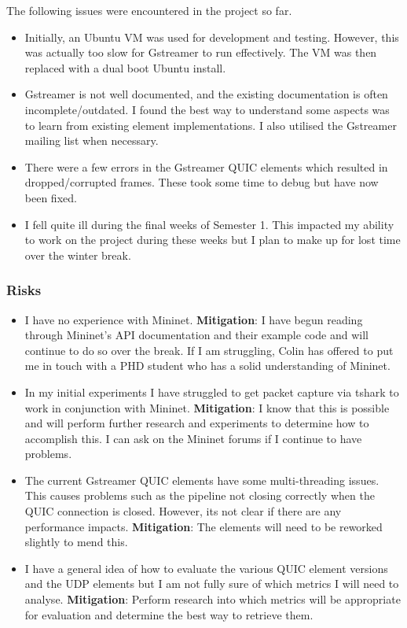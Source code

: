 \documentclass[11pt]{article}
\begin{document}
The following issues were encountered in the project so far.
\begin{itemize}
\item Initially, an Ubuntu VM was used for development and testing. However, this was actually
too slow for Gstreamer to run effectively. The VM was then replaced with a dual boot Ubuntu install.
\item Gstreamer is not well documented, and the existing documentation is often incomplete/outdated. I found the best way to understand some aspects was to learn from existing element implementations. I also utilised the Gstreamer mailing list when necessary.
\item There were a few errors in the Gstreamer QUIC elements which resulted in dropped/corrupted frames. These took some time to debug but have now been fixed.
\item I fell quite ill during the final weeks of Semester 1. This impacted my ability to work on the project during these weeks but I plan to make up for lost time over the winter break.
\end{itemize}

\subsubsection{Risks}\label{risks}

\begin{itemize}
\item I have no experience with Mininet. \textbf{Mitigation}: I have begun reading through Mininet's API documentation and their example code and will continue to do so over the break. If I am struggling, Colin has offered to put me in touch with a PHD student who has a solid understanding of Mininet.
\item In my initial experiments I have struggled to get packet capture via tshark to work in conjunction with Mininet. \textbf{Mitigation}: I know that this is possible and will perform further research and experiments to determine how to accomplish this. I can ask on the Mininet forums if I continue to have problems.
\item The current Gstreamer QUIC elements have some multi-threading issues. This causes problems such as 
the pipeline not closing correctly when the QUIC connection is closed. However, its not clear if there are 
any performance impacts. \textbf{Mitigation}: The elements will need to be reworked slightly to mend this.
\item I have a general idea of how to evaluate the various QUIC element versions and the UDP elements but I am not fully sure of which metrics I will need to analyse. \textbf{Mitigation}: Perform research into which metrics will be appropriate for evaluation and determine the best way to retrieve them.
\end{itemize}
    
\end{document}
